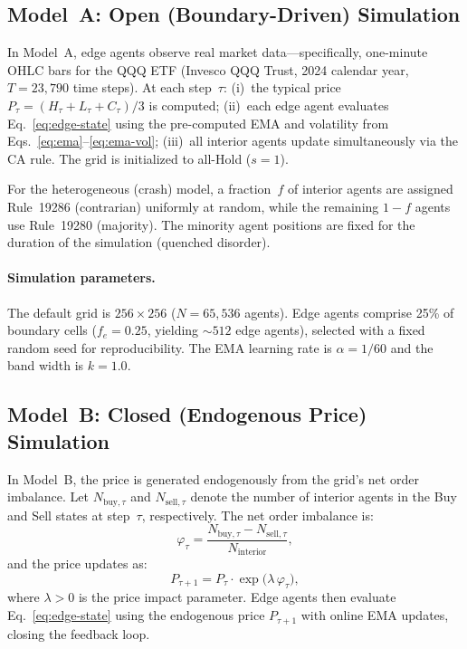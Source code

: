 
\subsection{Model~A: Open (Boundary-Driven) Simulation}
\label{sec:model-a}
In Model~A, edge agents observe real market data---specifically, one-minute OHLC bars
for the QQQ ETF (Invesco QQQ Trust, 2024 calendar year, $T = 23{,}790$ time steps).
At each step~$\tau$: (i)~the typical price
$P_\tau = (H_\tau + L_\tau + C_\tau)/3$ is computed; (ii)~each edge agent evaluates
Eq.~\eqref{eq:edge-state} using the pre-computed EMA and volatility from
Eqs.~\eqref{eq:ema}--\eqref{eq:ema-vol}; (iii)~all interior agents update
simultaneously via the CA rule. The grid is initialized to all-Hold ($s=1$).

For the heterogeneous (crash) model, a fraction~$f$ of interior agents are assigned
Rule~19286 (contrarian) uniformly at random, while the remaining $1-f$ agents use
Rule~19280 (majority). The minority agent positions are fixed for the duration of the
simulation (quenched disorder).

\paragraph{Simulation parameters.}
The default grid is $256 \times 256$ ($N = 65{,}536$ agents). Edge agents comprise
25\% of boundary cells ($f_e = 0.25$, yielding ${\sim}512$ edge agents), selected
with a fixed random seed for reproducibility. The EMA learning rate is
$\alpha = 1/60$ and the band width is $k = 1.0$.

\subsection{Model~B: Closed (Endogenous Price) Simulation}
\label{sec:model-b}
In Model~B, the price is generated endogenously from the grid's net order imbalance.
Let $N_{\text{buy},\tau}$ and $N_{\text{sell},\tau}$ denote the number of interior
agents in the Buy and Sell states at step~$\tau$, respectively. The net order
imbalance is:
\begin{equation}
  \varphi_\tau = \frac{N_{\text{buy},\tau} - N_{\text{sell},\tau}}{N_{\text{interior}}},
  \label{eq:imbalance}
\end{equation}
and the price updates as:
\begin{equation}
  P_{\tau+1} = P_\tau \cdot \exp\!\bigl(\lambda\,\varphi_\tau\bigr),
  \label{eq:price-update}
\end{equation}
where $\lambda > 0$ is the price impact parameter. Edge agents then evaluate
Eq.~\eqref{eq:edge-state} using the endogenous price $P_{\tau+1}$ with online
EMA updates, closing the feedback loop.

